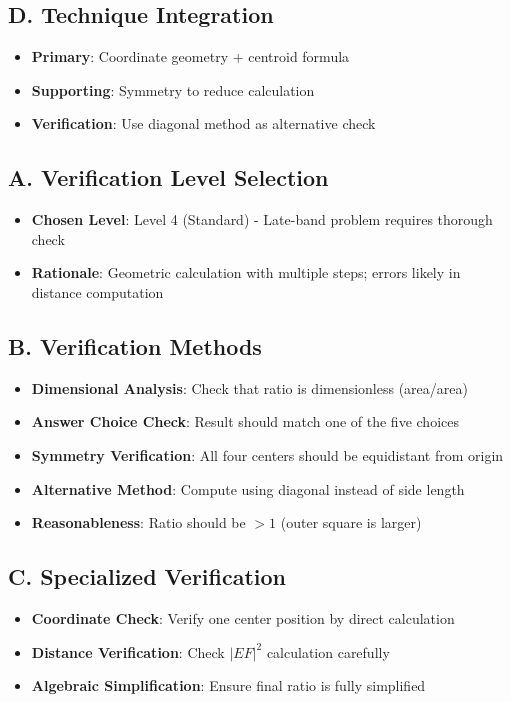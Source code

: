\documentclass[]{article}
\begin{document}
\begin{techniquesbox}
\subsection*{D. Technique Integration}
\begin{itemize}[leftmargin=*]
    \item \textbf{Primary}: Coordinate geometry + centroid formula
    \item \textbf{Supporting}: Symmetry to reduce calculation
    \item \textbf{Verification}: Use diagonal method as alternative check
\end{itemize}
\end{techniquesbox}

\begin{verificationbox}
\subsection*{A. Verification Level Selection}
\begin{itemize}[leftmargin=*]
    \item \textbf{Chosen Level}: Level 4 (Standard) - Late-band problem requires thorough check
    \item \textbf{Rationale}: Geometric calculation with multiple steps; errors likely in distance computation
\end{itemize}

\subsection*{B. Verification Methods}
\begin{itemize}[leftmargin=*]
    \item \textbf{Dimensional Analysis}: Check that ratio is dimensionless (area/area)
    \item \textbf{Answer Choice Check}: Result should match one of the five choices
    \item \textbf{Symmetry Verification}: All four centers should be equidistant from origin
    \item \textbf{Alternative Method}: Compute using diagonal instead of side length
    \item \textbf{Reasonableness}: Ratio should be $> 1$ (outer square is larger)
\end{itemize}

\subsection*{C. Specialized Verification}
\begin{itemize}[leftmargin=*]
    \item \textbf{Coordinate Check}: Verify one center position by direct calculation
    \item \textbf{Distance Verification}: Check $|EF|^2$ calculation carefully
    \item \textbf{Algebraic Simplification}: Ensure final ratio is fully simplified
\end{itemize}


\end{verificationbox}
\end{document}
